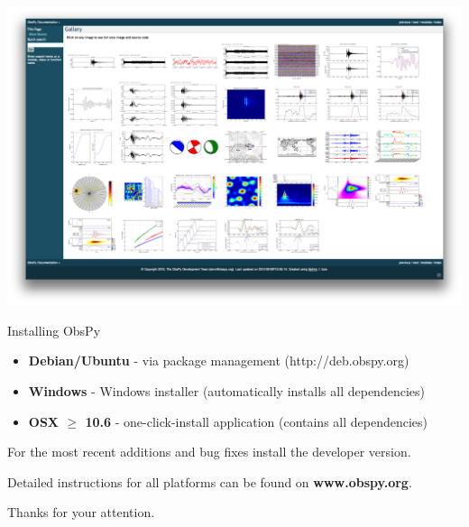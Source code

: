 \documentclass[handout]{beamer}
\begin{document}
\begin{frame}[plain]
\includegraphics[width=\textwidth]{./gallery.png}
\end{frame}



\begin{frame}[plain]{Installing ObsPy}
    \begin{itemize}
        \item \textbf{Debian/Ubuntu} - via package management (http://deb.obspy.org)
        \item \textbf{Windows} - Windows installer (automatically installs all dependencies)
        \item \textbf{OSX $\ge$ 10.6} - one-click-install application (contains all dependencies)
    \end{itemize}
    For the most recent additions and bug fixes install the developer version.

    \vspace{2em}

    Detailed instructions for all platforms can be found on \textbf{www.obspy.org}.
\end{frame}


\begin{frame}[plain]{}
    \begin{center}
        \textcolor{lmu@darkgreen}{\LARGE{Thanks for your attention.}}
    \end{center}
\end{frame}
\end{document}
